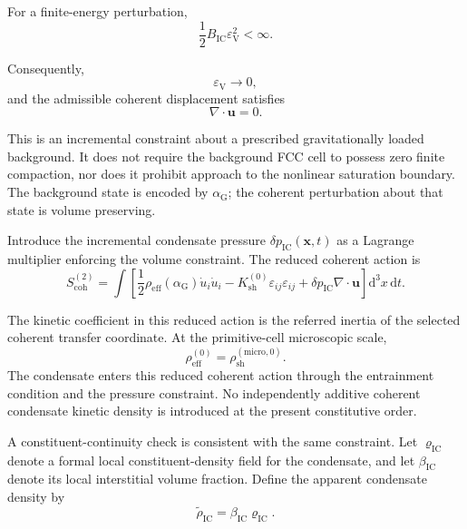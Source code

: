 For a finite-energy perturbation,
\begin{equation}
    \frac{1}{2}B_{\mathrm{IC}}\varepsilon_{\mathrm{V}}^2 < \infty.
\end{equation}

Consequently,
\begin{equation}
    \varepsilon_{\mathrm{V}} \rightarrow 0,
\end{equation}
and the admissible coherent displacement satisfies
\begin{equation}
    \nabla\cdot\mathbf{u} = 0.
\end{equation}

This is an incremental constraint about a prescribed gravitationally loaded background. It does not require the background FCC cell to possess zero finite compaction, nor does it prohibit approach to the nonlinear saturation boundary. The background state is encoded by $\alpha_{\mathrm{G}}$; the coherent perturbation about that state is volume preserving.

Introduce the incremental condensate pressure $\delta p_{\mathrm{IC}}(\mathbf{x},t)$ as a Lagrange multiplier enforcing the volume constraint. The reduced coherent action is
\begin{equation}
    S_{\mathrm{coh}}^{(2)} = \int \left[ \frac{1}{2}\rho_{\mathrm{eff}}(\alpha_{\mathrm{G}})\dot{u}_{i}\dot{u}_{i} - K_{\mathrm{sh}}^{(0)}\varepsilon_{ij}\varepsilon_{ij} + \delta p_{\mathrm{IC}}\nabla\cdot\mathbf{u} \right] \mathrm{d}^3x\,\mathrm{d}t.
\end{equation}

The kinetic coefficient in this reduced action is the referred inertia of the selected coherent transfer coordinate. At the primitive-cell microscopic scale,
\begin{equation}
    \rho_{\mathrm{eff}}^{(0)} = \rho_{\mathrm{sh}}^{(\mathrm{micro},0)}.
\end{equation}
The condensate enters this reduced coherent action through the entrainment condition and the pressure constraint. No independently additive coherent condensate kinetic density is introduced at the present constitutive order.

A constituent-continuity check is consistent with the same constraint. Let $\varrho_{\mathrm{IC}}$ denote a formal local constituent-density field for the condensate, and let $\beta_{\mathrm{IC}}$ denote its local interstitial volume fraction. Define the apparent condensate density by
\begin{equation}
    \widetilde{\rho}_{\mathrm{IC}} = \beta_{\mathrm{IC}}\varrho_{\mathrm{IC}}.
\end{equation}

